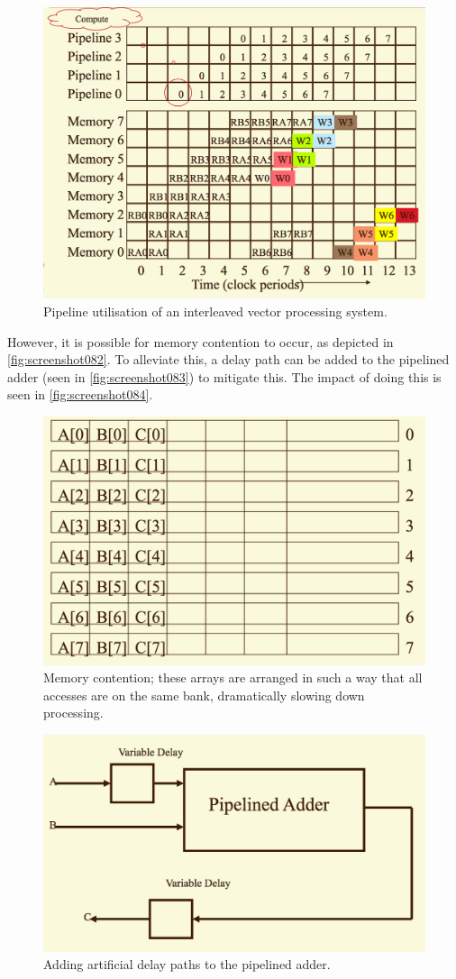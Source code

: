 \begin{figure}
\centering
\includegraphics[width=0.7\linewidth]{figures/screenshot081}
\caption{Pipeline utilisation of an interleaved vector processing system.}
\label{fig:screenshot081}
\end{figure}

However, it is possible for memory contention to occur, as depicted in \autoref{fig:screenshot082}. To alleviate this, a delay path can be added to the pipelined adder (seen in \autoref{fig:screenshot083}) to mitigate this. The impact of doing this is seen in \autoref{fig:screenshot084}.

\begin{figure}
\centering
\includegraphics[width=0.7\linewidth]{figures/screenshot082}
\caption[Memory contention.]{Memory contention; these arrays are arranged in such a way that all accesses are on the same bank, dramatically slowing down processing.}
\label{fig:screenshot082}
\end{figure}

\begin{figure}
\centering
\includegraphics[width=0.7\linewidth]{figures/screenshot083}
\caption{Adding artificial delay paths to the pipelined adder.}
\label{fig:screenshot083}
\end{figure}

